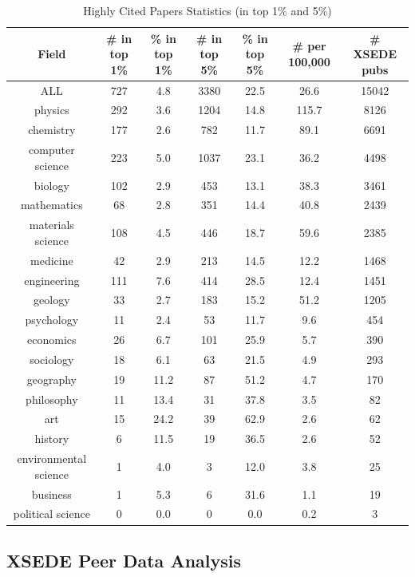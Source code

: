 \documentclass{sig-alternate}
\begin{document}
\begin{table}[t]
\caption{Highly Cited Papers Statistics (in top 1\% and 5\%)}
\label{T:field_highly_cited}
\centering
 \begin{tabular}{||c c c c c c c||}
 \hline
Field &	\# in top 1\% & \% in top 1\% & \# in top 5\% & \% in top 5\% & \# per 100,000 & \# XSEDE pubs \\ [0.5ex]
 \hline\hline
ALL & 727 & 4.8 & 3380 & 22.5 & 26.6 & 15042 \\
\hline
physics & 292 & 3.6 & 1204 & 14.8 & 115.7 & 8126 \\
\hline
chemistry & 177 & 2.6 & 782 & 11.7 & 89.1 & 6691 \\
\hline
computer science & 223 & 5.0 & 1037 & 23.1 & 36.2 & 4498 \\
\hline
biology & 102 & 2.9 & 453 & 13.1 & 38.3 & 3461 \\
\hline
mathematics & 68 & 2.8 & 351 & 14.4 & 40.8 & 2439 \\
\hline
materials science & 108 & 4.5 & 446 & 18.7 & 59.6 & 2385 \\
\hline
medicine & 42 & 2.9 & 213 & 14.5 & 12.2 & 1468 \\
\hline
engineering & 111 & 7.6 & 414 & 28.5 & 12.4 & 1451 \\
\hline
geology & 33 & 2.7 & 183 & 15.2 & 51.2 & 1205 \\
\hline
psychology & 11 & 2.4 & 53 & 11.7 & 9.6 & 454 \\
\hline
economics & 26 & 6.7 & 101 & 25.9 & 5.7 & 390 \\
\hline
sociology & 18 & 6.1 & 63 & 21.5 & 4.9 & 293 \\
\hline
geography & 19 & 11.2 & 87 & 51.2 & 4.7 & 170 \\
\hline
philosophy & 11 & 13.4 & 31 & 37.8 & 3.5 & 82 \\
\hline
art & 15 & 24.2 & 39 & 62.9 & 2.6 & 62 \\
\hline
history & 6 & 11.5 & 19 & 36.5 & 2.6 & 52 \\
\hline
environmental science & 1 & 4.0 & 3 & 12.0 & 3.8 & 25 \\
\hline
business & 1 & 5.3 & 6 & 31.6 & 1.1 & 19 \\
\hline
political science & 0 & 0.0 & 0 & 0.0 & 0.2 & 3 \\ [1ex]
 \hline
\end{tabular}
\end{table}

\subsection{XSEDE Peer Data Analysis} \label{S:xsede}
\end{document}

